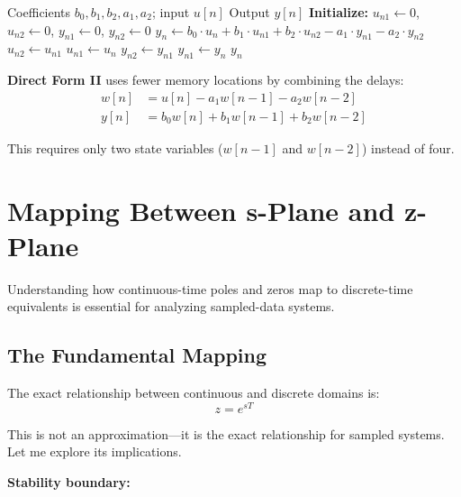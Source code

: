 \begin{algorithm}[htbp]
\caption{Direct Form I Implementation}
\label{alg:direct_form_1}
\begin{algorithmic}[1]
\REQUIRE Coefficients $b_0, b_1, b_2, a_1, a_2$; input $u[n]$
\ENSURE Output $y[n]$
\STATE \textbf{Initialize:} $u_{n1} \gets 0$, $u_{n2} \gets 0$, $y_{n1} \gets 0$, $y_{n2} \gets 0$
\STATE {}
\STATE $y_n \gets b_0 \cdot u_n + b_1 \cdot u_{n1} + b_2 \cdot u_{n2} - a_1 \cdot y_{n1} - a_2 \cdot y_{n2}$
\STATE $u_{n2} \gets u_{n1}$ 
\STATE $u_{n1} \gets u_n$
\STATE $y_{n2} \gets y_{n1}$ 
\STATE $y_{n1} \gets y_n$
\RETURN $y_n$
\end{algorithmic}
\end{algorithm}

\textbf{Direct Form II} uses fewer memory locations by combining the delays:
\begin{align}
w[n] &= u[n] - a_1 w[n-1] - a_2 w[n-2] \\
y[n] &= b_0 w[n] + b_1 w[n-1] + b_2 w[n-2]
\end{align}

This requires only two state variables ($w[n-1]$ and $w[n-2]$) instead of four.

\section{Mapping Between s-Plane and z-Plane}
\label{sec:s_to_z_mapping}

Understanding how continuous-time poles and zeros map to discrete-time equivalents is essential for analyzing sampled-data systems.

\subsection{The Fundamental Mapping}

The exact relationship between continuous and discrete domains is:
\begin{equation}
\boxed{z = e^{sT}}
\label{eq:s_to_z_mapping}
\end{equation}

This is not an approximation---it is the exact relationship for sampled systems. Let me explore its implications.

\textbf{Stability boundary:}

